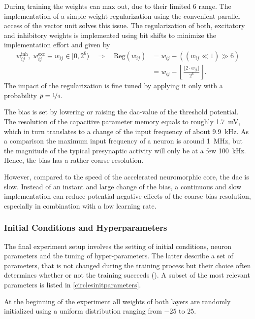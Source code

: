 During training the weights can max out, due to their limited \SI{6}{\bit} range. The implementation of a simple weight regularization using the convenient parallel access of the vector unit solves this issue. The regularization of both, excitatory and inhibitory weights is implemented using bit shifts to minimize the implementation effort and given by
\begin{align*}
w_{ij}^\text{inh},\; w_{ij}^\text{exc}\equiv w_{ij} \in [0,2^6) \quad  \Rightarrow \quad \text{Reg}(w_{ij}) &= w_{ij} - \left(\left(w_{ij} \ll 1\right) \gg 6\right) \nonumber \\
&= w_{ij} - \left\lfloor \frac{\lfloor 2 \cdot w_{ij}  \rfloor}{2^{6}} \right\rfloor.					
\end{align*}
The impact of the regularization is fine tuned by applying it only with a probability $p=\nicefrac{1}{4}$.

The bias is set by lowering or raising the \gls{dac}-value of the threshold potential. The resolution of the capacitive parameter memory equals to roughly \SI{1.7}{\milli \V}, which in turn translates to a change of the input frequency of about \SI{9.9}{\kilo \Hz}. As a comparison the maximum input frequency of a neuron is around \SI{1}{\mega \Hz}, but the magnitude of the typical presynaptic activity will only be at a few \SI{100}{\kilo \Hz}. Hence, the bias has a rather coarse resolution.

However, compared to the speed of the accelerated neuromorphic core, the \acrlong{dac} is slow. Instead of an instant and large change of the bias, a continuous and slow implementation can reduce potential negative effects of the coarse bias resolution, especially in combination with a low learning rate.

\subsubsection*{Initial Conditions and Hyperparameters}

The final experiment setup involves the setting of initial conditions, neuron parameters and the tuning of hyper-parameters. The latter describe a set of parameters, that is not changed during the training process but their choice often determines whether or not the training succeeds (\citealp{Goodfellow-et-al-2016}). A subset of the most relevant parameters is listed in \cref{circlesinitparameters}.

At the beginning of the experiment all weights of both layers are randomly initialized using a uniform distribution ranging from $-25$ to $25$. 


